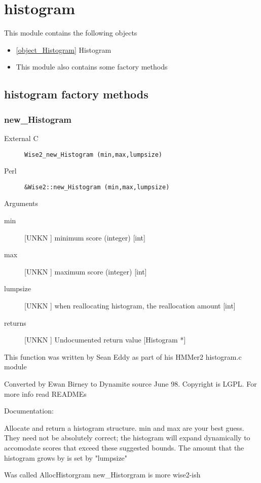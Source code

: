 \section{histogram}
\label{module_histogram}
This module contains the following objects

\begin{itemize}
\item \ref{object_Histogram} Histogram

\item This module also contains some factory methods
\end{itemize}
\subsection{histogram factory methods}
\subsubsection{new_Histogram}
\begin{description}
\item[External C] {\tt Wise2_new_Histogram (min,max,lumpsize)}
\item[Perl] {\tt &Wise2::new_Histogram (min,max,lumpsize)}

\end{description}
Arguments
\begin{description}
\item[min] [UNKN ] minimum score (integer) [int]
\item[max] [UNKN ] maximum score (integer) [int]
\item[lumpsize] [UNKN ] when reallocating histogram, the reallocation amount [int]
\item[returns] [UNKN ] Undocumented return value [Histogram *]
\end{description}


This function was written by Sean Eddy
as part of his HMMer2 histogram.c module


Converted by Ewan Birney to Dynamite source June 98.
Copyright is LGPL. For more info read READMEs


Documentation:


Allocate and return a histogram structure.
min and max are your best guess. They need
not be absolutely correct; the histogram
will expand dynamically to accomodate scores
that exceed these suggested bounds. The amount
that the histogram grows by is set by "lumpsize"


Was called AllocHistorgram new_Historgram is more wise2-ish




